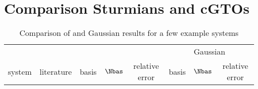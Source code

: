 \section{Comparison Sturmians and cGTOs}

\begin{table}
	\centering
	\begin{tabular}{lc|ccc|ccc}
		       &            & \multicolumn{3}{c}{\CS}     & \multicolumn{3}{c}{Gaussian} \\
		system & literature & basis & $\Nbas$ & relative error & basis & $\Nbas$ & relative error \\
	\end{tabular}
	\caption{Comparison of \CS and Gaussian results for a few example systems}
	\label{tab:CSvsGaussian}
\end{table}




